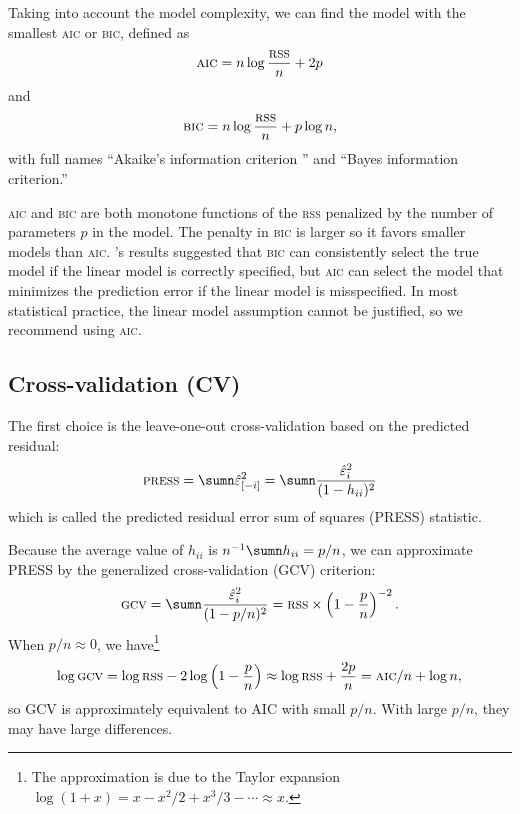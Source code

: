 Taking into account the model complexity, we can find the model with the smallest \textsc{aic} or \textsc{bic}, defined as
\[
\textsc{aic}=n\log\frac{\textsc{rss}}{n}+2p
\]
and
\[
\textsc{bic}=n\log\frac{\textsc{rss}}{n}+p\log n,
\]
with full names
``Akaike's information criterion '' and 
``Bayes information criterion.''

\textsc{aic} and \textsc{bic} are both monotone functions of the \textsc{rss} penalized by the number of parameters $p$ in the model. The penalty in \textsc{bic} is larger so it favors smaller models than \textsc{aic}. \citet{shao1997asymptotic}'s results suggested that \textsc{bic} can consistently select the true model if the linear model is correctly specified, but \textsc{aic} can select the model that minimizes the prediction error if the linear model is misspecified. In most statistical practice, the linear model assumption cannot be justified, so we recommend using \textsc{aic}. 




\subsection{Cross-validation (CV)}

The first choice is the leave-one-out cross-validation based on the predicted residual: 
\begin{equation}
\label{eq::press-stat}
\textsc{press}=\sumn\hat{\varepsilon}_{[-i]}^{2}=\sumn\frac{\hat{\varepsilon}_i^{2}}{(1-h_{ii})^{2}}
\end{equation}
which is called the predicted residual error sum of squares (PRESS)
statistic. 

Because the average value of $h_{ii}$ is $n^{-1}\sumn h_{ii}=p/n$,
we can approximate PRESS by the generalized cross-validation (GCV)
criterion:
\[
\textsc{gcv}=\sumn\frac{\hat{\varepsilon}_i^{2}}{(1-p/n)^{2}}=\textsc{rss}\times\left(1-\frac{p}{n}\right)^{-2}.
\]
When $p/n\approx0$, we have\footnote{The approximation is due to the Taylor expansion $\log(1+x) = x - x^2/2 + x^3/3 - \cdots \approx x$.}
\[
\log\textsc{gcv}=\log\textsc{rss}-2\log\left(1-\frac{p}{n}\right)\approx\log\textsc{rss}+\frac{2p}{n}=\textsc{aic}/n+\log n,
\]
so GCV is approximately equivalent to AIC with small $p/n$. With large $p/n$, they may have large differences. 

